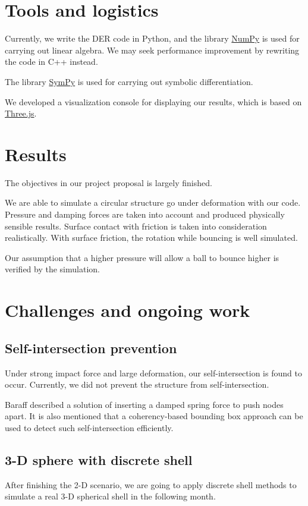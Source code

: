 \documentclass[letterpaper,9pt]{article}
\begin{document}
\begin{multicols}{2}
	\section{Tools and logistics}
		Currently, we write the DER code in Python, and the library \href{http://www.numpy.org}{NumPy} is used for carrying out linear algebra. We may seek performance improvement by rewriting the code in C++ instead.
		
		The library \href{http://www.sympy.org/}{SymPy} is used for carrying out symbolic differentiation.
		
		We developed a visualization console for displaying our results, which is based on \href{https://threejs.org/}{Three.js}.	
	\section{Results}
		The objectives in our project proposal is largely finished.
		
		We are able to simulate a circular structure go under deformation with our code. Pressure and damping forces are taken into account and produced physically sensible results. Surface contact with friction is taken into consideration realistically. With surface friction, the rotation while bouncing is well simulated.
		
		Our assumption that a higher pressure will allow a ball to bounce higher is verified by the simulation.
	\section{Challenges and ongoing work}
		\subsection{Self-intersection prevention}
			Under strong impact force and large deformation, our self-intersection is found to occur. Currently, we did not prevent the structure from self-intersection.
			
			Baraff \cite{Baraff98} described a solution of inserting a damped spring force to push nodes apart. It is also mentioned that a coherency-based bounding box
			approach can be used to detect such self-intersection efficiently.
		\subsection{3-D sphere with discrete shell}
			After finishing the 2-D scenario, we are going to apply discrete shell methods to simulate a real 3-D spherical shell in the following month.
			

\end{multicols}
\end{document}
